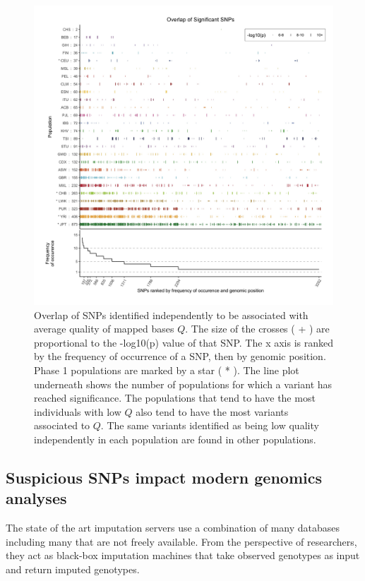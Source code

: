 \documentclass[9pt,lineno]{elife}
\begin{document}
\begin{figure}
\includegraphics[width=\hsize,keepaspectratio]{./Figures/SNPOverlap6.jpg}

\caption{Overlap of SNPs identified independently to be associated with average quality of mapped bases $Q$.
The size of the crosses ( + ) are proportional to the -log10(p) value of that SNP.
The x axis is ranked by the frequency of occurrence of a SNP, then by genomic position.
Phase 1 populations are marked by a star ( * ).
The line plot underneath shows the number of populations for which a variant has reached significance.
The populations that tend to have the most individuals with low $Q$ also tend to have the most variants associated to $Q$. 
The same variants identified as being low quality independently in each population are found in other populations. }
  \label{OverLap}
\end{figure}

\subsection{Suspicious SNPs impact modern genomics analyses}
The state of the art imputation servers use a combination of many databases including many that are not freely available.
From the perspective of researchers, they act as black-box imputation machines that take observed genotypes as input and return imputed genotypes.  
\end{document}
